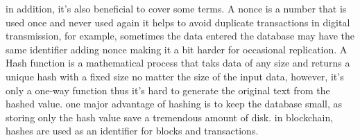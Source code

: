 in addition, it's also beneficial to cover some terms. 
A nonce is a number that is used once and never used again it helps to avoid duplicate transactions in digital transmission, for example, sometimes the data entered the database may have the same identifier adding nonce making it a bit harder for occasional replication. 
A Hash function is a mathematical process that taks data of any size and returns a unique hash with a fixed size no matter the size of the input data, however, it's only a one-way function thus it's hard to generate the original text from the hashed value. one major advantage of hashing is to keep the database small, as storing only the hash value save a tremendous amount of disk. in blockchain, hashes are used as an identifier for blocks and transactions. \\ 

